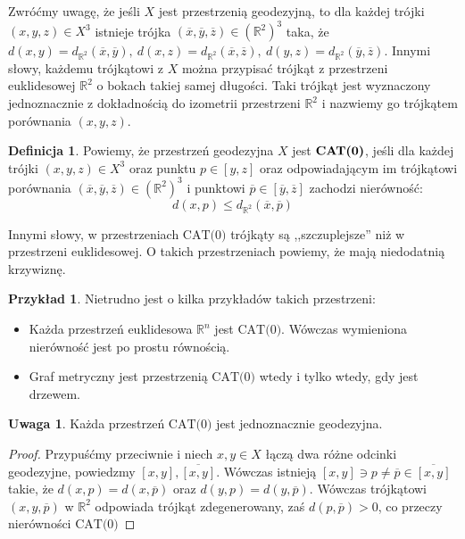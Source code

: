 \documentclass[licencjacka]{pracamgr}
\theoremstyle{definition}
\newtheorem{definition}{Definicja}[section]
\theoremstyle{definition}
\newtheorem{remark}{Uwaga}[section]
\theoremstyle{definition}
\newtheorem{example}{Przykład}[section]
\theoremstyle{definition}
\theoremstyle{plain}
\theoremstyle{plain}
\begin{document}
Zwróćmy uwagę, że jeśli $ X $ jest przestrzenią geodezyjną, to dla każdej trójki 
$ (x,y,z) \in X^3 $ istnieje trójka $ (\overline{x},\overline{y}, \overline{z}) 
\in \left(\mathbb{R}^2\right)^3$ taka, że $ d(x,y) = d_{\mathbb{R}^2} (\overline{x}, 
\overline{y}), ~ d(x,z) = d_{\mathbb{R}^2} (\overline{x}, \overline{z}), 
~ d(y,z) = d_{\mathbb{R}^2} (\overline{y}, \overline{z})  $. Innymi słowy, każdemu 
trójkątowi z $ X $ można przypisać trójkąt z przestrzeni euklidesowej $ \mathbb{R}^2 $ o 
bokach takiej samej długości. Taki trójkąt jest wyznaczony jednoznacznie z dokładnością 
do izometrii przestrzeni $ \mathbb{R}^2 $ i nazwiemy go trójkątem porównania $ (x,y,z) $.

\begin{definition}
	Powiemy, że przestrzeń geodezyjna $ X $ jest $ \text{\textbf{CAT(0)}} $, jeśli 
	dla każdej trójki $ (x,y,z) \in X^3 $ oraz punktu $ p \in [y,z] $ oraz odpowiadającym 
	im trójkątowi porównania $ (\overline{x}, \overline{y}, \overline{z}) \in 
	\left(\mathbb{R}^2\right)^3 $ i punktowi $ \overline{p} \in [\overline{y}, 
	\overline{z}] $ zachodzi nierówność:
	$$ d(x,p) \leq d_{\mathbb{R}^2}(\overline{x}, \overline{p}) $$
\end{definition} 

Innymi słowy, w przestrzeniach $ \text{CAT(0)} $ trójkąty są ,,szczuplejsze'' niż w 
przestrzeni euklidesowej. O takich przestrzeniach powiemy, że mają niedodatnią 
krzywiznę.


\begin{example} Nietrudno jest o kilka przykładów takich przestrzeni:
	\begin{itemize}
	\item Każda przestrzeń euklidesowa $ \mathbb{R}^n $ jest $ \text{CAT(0)} $. Wówczas 
	wymieniona nierówność jest po prostu równością.
	\item Graf metryczny jest przestrzenią $ \text{CAT(0)} $ wtedy i tylko wtedy, gdy 
	jest drzewem.
	\end{itemize}
\end{example}

\begin{remark}
	Każda przestrzeń $ \text{CAT(0)} $ jest jednoznacznie geodezyjna.
\end{remark}
\begin{proof}
	Przypuśćmy przeciwnie i niech $ x,y \in X $ łączą dwa różne odcinki geodezyjne, 
	powiedzmy $ [x,y], \overline{[x,y]} $.	Wówczas istnieją $ [x,y] \ni p \neq \overline p 
	\in	\overline{[x,y]}  $ takie, że $ d(x,p) = d(x,\overline{p}) $ oraz $ d(y,p) = 
	d(y, \overline{p}) $. Wówczas trójkątowi $ (x,y,\overline{p}) $ w $ \mathbb{R}^2$ 
	odpowiada trójkąt zdegenerowany, zaś $ d(p,\overline{p}) > 0 $, co przeczy nierówności 
	$ \text{CAT(0)} $
\end{proof}
\end{document}
